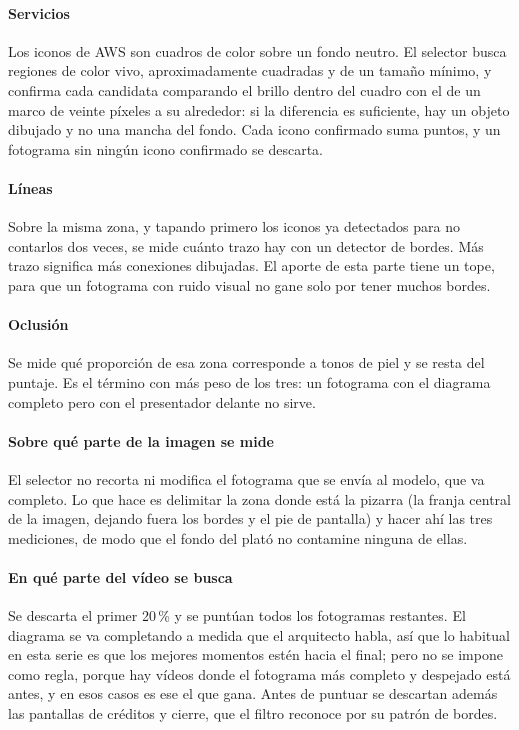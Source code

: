 \documentclass[a4paper, twocolumn, 10pt]{IEEEtran}
\begin{document}
\paragraph{Servicios} Los iconos de AWS son cuadros de color sobre un fondo neutro. El selector busca regiones de color vivo, aproximadamente cuadradas y de un tamaño mínimo, y confirma cada candidata comparando el brillo dentro del cuadro con el de un marco de veinte píxeles a su alrededor: si la diferencia es suficiente, hay un objeto dibujado y no una mancha del fondo. Cada icono confirmado suma puntos, y un fotograma sin ningún icono confirmado se descarta. 
 
\paragraph{Líneas} Sobre la misma zona, y tapando primero los iconos ya detectados para no contarlos dos veces, se mide cuánto trazo hay con un detector de bordes. Más trazo significa más conexiones dibujadas. El aporte de esta parte tiene un tope, para que un fotograma con ruido visual no gane solo por tener muchos bordes. 
 
\paragraph{Oclusión} Se mide qué proporción de esa zona corresponde a tonos de piel y se resta del puntaje. Es el término con más peso de los tres: un fotograma con el diagrama completo pero con el presentador delante no sirve. 
\paragraph{Sobre qué parte de la imagen se mide} El selector no recorta ni modifica el fotograma que se envía al modelo, que va completo. Lo que hace es delimitar la zona donde está la pizarra (la franja central de la imagen, dejando fuera los bordes y el pie de pantalla) y hacer ahí las tres mediciones, de modo que el fondo del plató no contamine ninguna de ellas. 
 
\paragraph{En qué parte del vídeo se busca} Se descarta el primer 20\,\% y se puntúan todos los fotogramas restantes. El diagrama se va completando a medida que el arquitecto habla, así que lo habitual en esta serie es que los mejores momentos estén hacia el final; pero no se impone como regla, porque hay vídeos donde el fotograma más completo y despejado está antes, y en esos casos es ese el que gana. Antes de puntuar se descartan además las pantallas de créditos y cierre, que el filtro reconoce por su patrón de bordes.
 
\end{document}
